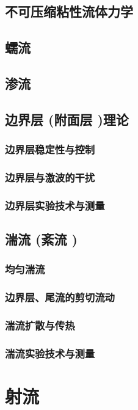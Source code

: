 \documentclass[UTF8]{../../06-Physics}
\begin{document}
    \section{不可压缩粘性流体力学}
    \section{蠕流}
    \section{渗流}
    \section{边界层 (附面层 )理论}
        \subsection{边界层稳定性与控制}
        \subsection{边界层与激波的干扰}
        \subsection{边界层实验技术与测量}

    \section{湍流 (紊流 )}
        \subsection{均匀湍流}
        \subsection{边界层、尾流的剪切流动}
        \subsection{湍流扩散与传热}
        \subsection{湍流实验技术与测量}



\chapter{射流}
\end{document}
